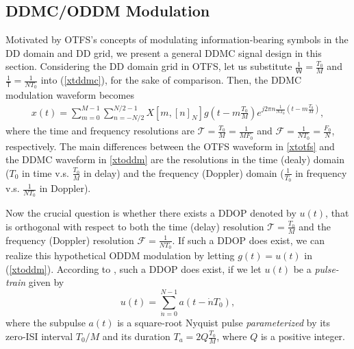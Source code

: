 \documentclass[journal]{IEEEtran}
\begin{document}
\subsection{DDMC/ODDM Modulation}
Motivated by OTFS's concepts of modulating information-bearing symbols in the DD domain and DD grid, we present a general DDMC signal design in this section. Considering the DD domain grid in OTFS, let us substitute $\frac{1}{\mathsf W}=\frac{T_0}{M}$ and $\frac{1}{\mathsf T}=\frac{1}{NT_0}$ into (\ref{xtddmc}), for the sake of comparison. Then, the DDMC modulation waveform becomes
\begin{align}\label{xtoddm}
  x(t)=\sum_{m=0}^{M-1}\sum_{n=-N/2}^{N/2-1} X[m,[n]_N]g\left(t-m\frac{T_0}{M}\right)e^{j2\pi n \frac{1}{NT_0} (t-m\frac{T_0}{M})},
\end{align}
where the time and frequency resolutions are $\mathcal T=\frac{T_0}{M}=\frac{1}{MF_0}$ and $\mathcal F=\frac{1}{NT_0}=\frac{F_0}{N}$, respectively. {The main differences between the OTFS waveform in \eqref{xtotfs} and the DDMC waveform in \eqref{xtoddm} are the resolutions in the time (dealy) domain ($T_0$ in time v.s. $\frac{T_0}{M}$ in delay) and the frequency (Doppler) domain ($\frac{1}{T_0}$ in frequency v.s. $\frac{1}{N T_0}$ in Doppler).}

Now the crucial question is whether there exists a DDOP denoted by $u(t)$,  that is orthogonal with respect to both the time (delay) resolution $\mathcal T=\frac{T_0}{M}$ and the frequency (Doppler) resolution $\mathcal F=\frac{1}{NT_0}$.
If such a DDOP does exist, we can realize this hypothetical ODDM modulation by letting $g(t)=u(t)$ in (\ref{xtoddm}).
According to \cite{oddmicc22}, such a DDOP does exist, if we let $u(t)$ be a \emph{pulse-train} given by
\begin{equation}\label{ut}
  u(t)=\sum_{\dot n=0}^{N-1}a(t-\dot nT_0),
\end{equation}
where the subpulse $a(t)$ is a square-root Nyquist pulse \emph{parameterized} by its zero-ISI interval $T_0/M$ and its duration $T_a=2Q\frac{T_0}{M}$, {where $Q$ is a positive integer}.
\end{document}
